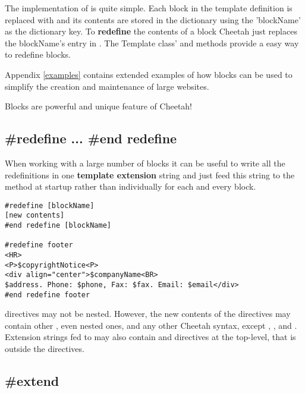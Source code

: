 The implementation of  is quite simple.  Each block in the
template definition is replaced with  and its contents are stored in the dictionary
 using the 'blockName' as the dictionary key.  To
{\bf redefine} the contents of a block Cheetah just replaces the blockName's
entry in .  The Template class'
 and 
methods provide a easy way to redefine blocks.

Appendix \ref{examples} contains extended examples of how blocks can be used to
simplify the creation and maintenance of large websites.

Blocks are powerful and unique feature of Cheetah!

\subsection{\#redefine ... \#end redefine}
\label{directives.redefine}

When working with a large number of blocks it can be useful to write all the
redefinitions in one {\bf template extension} string and just feed this string
to the  method at startup rather
than individually  for each and every block.

\begin{verbatim}
#redefine [blockName]
[new contents]
#end redefine [blockName]

#redefine footer
<HR>
<P>$copyrightNotice<P>
<div align="center">$companyName<BR>
$address. Phone: $phone, Fax: $fax. Email: $email</div>
#end redefine footer
\end{verbatim}

 directives may not be nested.  However, the new contents of
the  directives may contain other , even nested
ones, and any other Cheetah syntax, except , , and
. Extension strings fed to
 may also contain  and
 directives at the top-level, that is outside the
 directives.

\subsection{\#extend}
\label{directives.extend}

